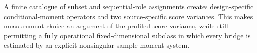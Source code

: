A finite catalogue of subset and sequential-role assignments creates design-specific conditional-moment operators and two source-specific score variances.  This makes measurement choice an argument of the profiled score variance, while still permitting a fully operational fixed-dimensional subclass in which every bridge is estimated by an explicit nonsingular sample-moment system.